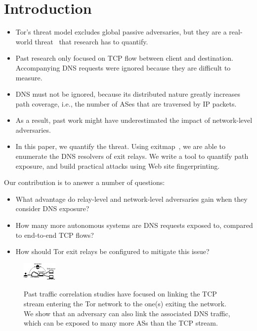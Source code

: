 \section{Introduction}
\label{sec:introduction}

\begin{itemize}
	\item Tor's threat model excludes global passive adversaries, but they are a
		real-world threat~\cite{torstinks} that research has to quantify.

	\item Past research only focused on TCP flow between client and destination.
		Accompanying DNS requests were ignored because they are difficult to
		measure.

	\item DNS must not be ignored, because its distributed nature greatly
		increases path coverage, i.e., the number of ASes that are traversed by
		IP packets.

	\item As a result, past work might have underestimated the impact of
		network-level adversaries.

	\item In this paper, we quantify the threat.  Using
		exitmap~\cite{Winter2014b}, we are able to enumerate the DNS resolvers
		of exit relays.  We write a tool to quantify path exposure, and build
		practical attacks using Web site fingerprinting.
\end{itemize}

Our contribution is to answer a number of questions:
\begin{itemize}
	\item What advantage do relay-level and network-level adversaries gain when
		they consider DNS exposure?

	\item How many more autonomous systems are DNS requests exposed to, compared
		to end-to-end TCP flows?

	\item How should Tor exit relays be configured to mitigate this issue?
\end{itemize}

\begin{figure}[t]
	\centering
	\includegraphics[width=0.8\linewidth]{figures/attack-concept.pdf}
	\label{fig:overview}
	\caption{Past traffic correlation studies have focused on linking the TCP
		stream entering the Tor network to the one(s) exiting the network.  We
		show that an adversary can also link the associated DNS traffic, which
		can be exposed to many more ASs than the TCP stream.}
\end{figure}


